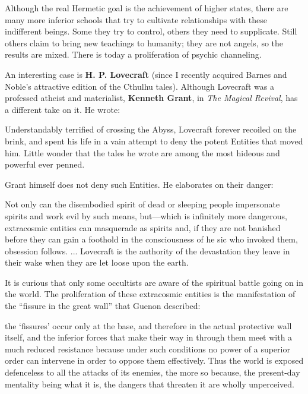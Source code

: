 Although the real Hermetic goal is the achievement of higher states, there are many more inferior schools that try to cultivate relationships with these indifferent beings. Some they try to control, others they need to supplicate. Still others claim to bring new teachings to humanity; they are not angels, so the results are mixed. There is today a proliferation of psychic channeling.

An interesting case is \textbf{H. P. Lovecraft} (since I recently acquired Barnes and Noble's attractive edition of the Cthulhu tales). Although Lovecraft was a professed atheist and materialist,
\textbf{Kenneth Grant}, in \emph{The Magical Revival}, has a different take on it. He wrote:

\begin{quotex}
Understandably terrified of crossing the Abyss, Lovecraft forever recoiled on the brink, and spent his life in a vain attempt to deny the potent Entities that moved him. Little wonder that the tales he wrote are among the most hideous and powerful ever penned.
\end{quotex}


Grant himself does not deny such Entities. He elaborates on their danger:

\begin{quotex}
Not only can the disembodied spirit of dead or sleeping people impersonate spirits and work evil by such means, but---which is infinitely more dangerous, extracosmic entities can masquerade as spirits and, if they are not banished before they can gain a foothold in the consciousness of he sic who invoked them, obsession follows. ... Lovecraft is the authority of the devastation they leave in their wake when they are let loose upon the earth.
\end{quotex}


It is curious that only some occultists are aware of the spiritual battle going on in the world. The proliferation of these extracosmic entities is the manifestation of the ``fissure in the great wall'' that Guenon described:

\begin{quotex}
the `fissures' occur only at the base, and therefore in the actual protective wall itself, and the inferior forces that make their way in through them meet with a much reduced resistance because under such conditions no power of a superior order can intervene in order to oppose them effectively. Thus the world is exposed defenceless to all the attacks of its enemies, the more so because, the present-day mentality being what it is, the dangers that threaten it are wholly unperceived.
\end{quotex}


